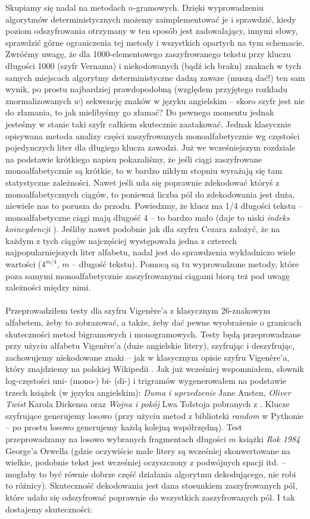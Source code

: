 \documentclass[a4paper]{article}
\theoremstyle{defn}
\theoremstyle{theorem}
\theoremstyle{lemma}
\theoremstyle{cor}
\theoremstyle{fact}
\begin{document}
Skupiamy się nadal na metodach $n$-gramowych. Dzięki wyprowadzeniu algorytmów deterministycznych możemy zaimplementować je i sprawdzić, kiedy poziom odszyfrowania otrzymany w ten sposób jest zadowalający, innymi słowy, sprawdzić górne ograniczenia tej metody i wszystkich opartych na tym schemacie. Zwróćmy uwagę, że dla 1000-elementowego zaszyfrowanego tekstu przy kluczu długości 1000 (szyfr Vernama) i niekodowanych (bądź ich braku) znakach w tych samych miejscach algorytmy deterministyczne dadzą zawsze (muszą dać!) ten sam wynik, po prostu najbardziej prawdopodobną (względem przyjętego rozkładu znormalizowanych $w$) sekwencję znaków w języku angielskim – skoro szyfr jest nie do złamania, to jak mielibyśmy go złamać? Do pewnego momentu jednak jesteśmy w stanie taki szyfr całkiem skutecznie zaatakować. Jednak klasycznie opisywana metoda analizy części zaszyfrowanych monoalfabetycznie wg częstości pojedynczych liter dla długiego klucza zawodzi. Już we wcześniejszym rozdziale na podstawie krótkiego napisu pokazaliśmy, że jeśli ciągi zaszyfrowane monoalfabetycznie są krótkie, to w bardzo nikłym stopniu wyrażają się tam statystyczne zależności. Nawet jeśli uda się poprawnie zdekodować któryś z monoalfabetycznych ciągów, to ponieważ liczba pól do zdekodowania jest duża, niewiele nas to porusza do przodu. Powiedzmy, że klucz ma 1/4 długości tekstu – monoalfabetyczne ciągi mają długość 4 – to bardzo mało (daje to niski \textit{indeks koincydencji} \cite{coinc}). Jeśliby nawet podobnie jak dla szyfru Cezara założyć, że na każdym z tych ciągów najczęściej występowała jedna z czterech najpopularniejszych liter alfabetu, nadal jest do sprawdzenia wykładniczo wiele wartości ($4^{m/4}$, $m$ – długość tekstu). Pomocą są tu wyprowadzone metody, które poza samymi monoalfabetycznie zaszyfrowanymi ciągami biorą też pod uwagę zależności między nimi. \\\\
Przeprowadziłem testy dla szyfru Vigenère'a z klasycznym 26-znakowym alfabetem, żeby to zobrazować, a także, żeby dać pewne wyobrażenie o granicach skuteczności metod bigramowych i monogramowych. Testy będą przeprowadzane przy użyciu alfabetu Vigenère'a (duże angielskie litery), szyfrując i deszyfrując, zachowujemy niekodowane znaki – jak w klasycznym opisie szyfru Vigenère'a, który znajdziemy na polskiej Wikipedii \cite{vigenere}. Jak już wcześniej wspomniałem, słownik log-częstości uni- (mono-) bi- (di-) i trigramów wygenerowałem na podstawie trzech książek (w języku angielskim): \textit{Duma i uprzedzenie} Jane Austen, \textit{Oliver Twist} Karola Dickensa oraz \textit{Wojna i pokój} Lwa Tołstoja pobranych z \cite{gutenberg}. Klucze szyfrujące generujemy losowo (przy użyciu metod z biblioteki \textit{random} w Pythonie – po prostu losowo generujemy każdą kolejną współrzędną). Test przeprowadzamy na losowo wybranych fragmentach długości $m$ książki \textit{Rok 1984} George'a Orwella (gdzie oczywiście małe litery są wcześniej skonwertowane na wielkie, podobnie tekst jest wcześniej oczyszczony z podwójnych spacji itd. – mogłaby to być równie dobrze część działania algorytmu dekodującego, nie robi to różnicy). Skuteczność dekodowania jest dana stosunkiem zaszyfrowanych pól, które udało się odszyfrować poprawnie do wszystkich zaszyfrowanych pól. I tak dostajemy skuteczności:\\
\end{document}
